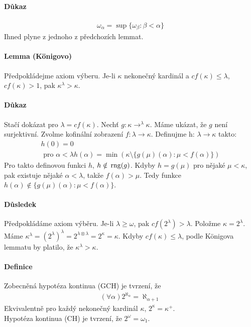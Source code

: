 \documentclass[a4paper,12pt,titlepage]{article}
\begin{document}
\paragraph{Důkaz}
\begin{align}
	\omega_\alpha = \sup\{\omega_\beta : \beta < \alpha \}
\end{align}
Ihned plyne z jednoho z předchozích lemmat.
\paragraph{Lemma (Königovo)}
Předpokládejme axiom výberu. Je-li $\kappa$ nekonečný kardinál a $cf(\kappa) \le
\lambda$, $cf(\kappa) > 1$, pak $\kappa^\lambda > \kappa$.
\paragraph{Důkaz}
Stačí dokázat pro $\lambda = cf(\kappa)$. 
Nechť $g : \kappa \to ^\lambda \kappa$. Máme ukázat, že $g$ není surjektivní.
Zvolme kofinální zobrazení $f: \lambda \to \kappa$. Definujme h: $\lambda \to
\kappa$ takto: 
\begin{align}
	h(0) = 0 \\
	\text{ pro } \alpha < \lambda h(\alpha) = \min \left( \kappa \setminus
	\{g(\mu)(\alpha) : \mu < f(\alpha) \} \right)
\end{align}
Pro takto definovou funkci $h$, $h \notin \operatorname*{\,rng}(g)$. Kdyby $h = g(\mu)$ pro nějaké
$\mu <\kappa$, pak existuje nějaké $\alpha <\lambda$, takže $f(\alpha) >\mu$.
Tedy funkce $h(\alpha) \nin \{g(\mu)(\alpha) : \mu < f(\alpha)\}$.
\paragraph{Důsledek}
Předpokládáme axiom výběru. Je-li $\lambda \ge \omega$, pak $cf(2^\lambda) >
\lambda$. Položme $\kappa = 2^\lambda$. Máme $\kappa^\lambda = (2^\lambda)^\lambda
= 2^{\lambda \otimes\lambda} = 2^\kappa = \kappa$. Kdyby $cf(\kappa) \le \lambda$,
podle Königova lemmatu by platilo, že $\kappa^\lambda > \kappa$.
\paragraph{Definice}
Zobecněná hypotéza kontinua (GCH) je tvrzení, že 
\begin{align}
	(\forall \alpha) 2^{\aleph_\alpha} = \aleph_{\alpha + 1}
\end{align}
Ekvivalentně pro každý nekonečný kardinál $\kappa$, $2^\kappa = \kappa^+$. \\
Hypotéza kontinua (CH) je tvrzení, že $2^\omega = \omega_1$.
\end{document}
